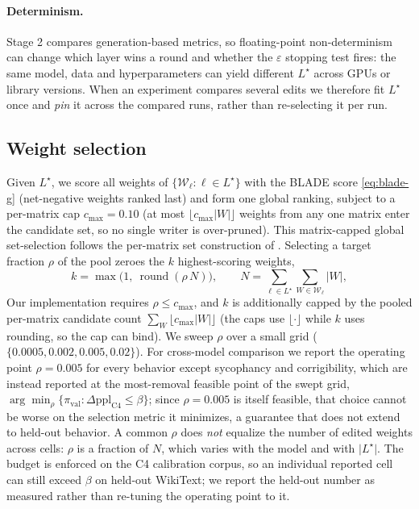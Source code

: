 \paragraph{Determinism.} Stage 2 compares generation-based metrics, so floating-point non-determinism can change which layer wins a round and whether the $\varepsilon$ stopping test fires: the same model, data and hyperparameters can yield different $L^\star$ across GPUs or library versions. When an experiment compares several edits we therefore fit $L^\star$ once and \emph{pin} it across the compared runs, rather than re-selecting it per run.

\subsection{Weight selection}
\label{sec:weightsel}
Given $L^\star$, we score all weights of $\{\mathcal{W}_\ell:\ell\in L^\star\}$ with the BLADE score \eqref{eq:blade-g} (net-negative weights ranked last) and form one global ranking, subject to a per-matrix cap $c_{\max}=0.10$ (at most $\lfloor c_{\max}\lvert W\rvert\rfloor$ weights from any one matrix enter the candidate set, so no single writer is over-pruned). This matrix-capped global set-selection follows the per-matrix set construction of \cite{wei2024brittleness}. Selecting a target fraction $\rho$ of the pool zeroes the $k$ highest-scoring weights,
\begin{equation}
  k=\max\bigl(1,\ \operatorname{round}(\rho\, N)\bigr),\qquad
  N=\sum_{\ell\in L^\star}\sum_{W\in\mathcal{W}_\ell}\lvert W\rvert,
\end{equation}
Our implementation requires $\rho\le c_{\max}$, and $k$ is additionally capped by the pooled per-matrix candidate count $\sum_W\lfloor c_{\max}\lvert W\rvert\rfloor$ (the caps use $\lfloor\cdot\rfloor$ while $k$ uses rounding, so the cap can bind). We sweep $\rho$ over a small grid ($\{0.0005,0.002,0.005,0.02\}$). For cross-model comparison we report the operating point $\rho=0.005$ for every behavior except sycophancy and corrigibility, which are instead reported at the most-removal feasible point of the swept grid, $\arg\min_{\rho}\{\pi_{\text{val}}:\Delta\mathrm{ppl}_{\mathrm{C4}}\le\beta\}$; since $\rho=0.005$ is itself feasible, that choice cannot be worse on the selection metric it minimizes, a guarantee that does not extend to held-out behavior. A common $\rho$ does \emph{not} equalize the number of edited weights across cells: $\rho$ is a fraction of $N$, which varies with the model and with $\lvert L^\star\rvert$. The budget is enforced on the C4 calibration corpus, so an individual reported cell can still exceed $\beta$ on held-out WikiText; we report the held-out number as measured rather than re-tuning the operating point to it.

